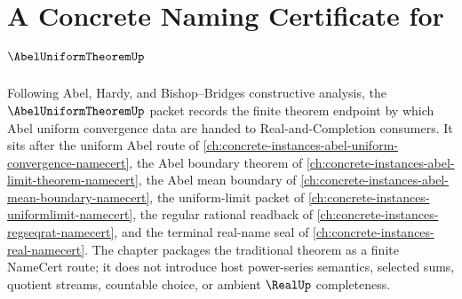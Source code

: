 \chapter{A Concrete Naming Certificate for $\AbelUniformTheoremUp$}
\label{ch:concrete-instances-abel-uniform-theorem-namecert}

Following Abel, Hardy, and Bishop--Bridges constructive analysis, the $\AbelUniformTheoremUp$ packet records the finite theorem endpoint by which Abel uniform convergence data are handed to Real-and-Completion consumers. It sits after the uniform Abel route of \autoref{ch:concrete-instances-abel-uniform-convergence-namecert}, the Abel boundary theorem of \autoref{ch:concrete-instances-abel-limit-theorem-namecert}, the Abel mean boundary of \autoref{ch:concrete-instances-abel-mean-boundary-namecert}, the uniform-limit packet of \autoref{ch:concrete-instances-uniformlimit-namecert}, the regular rational readback of \autoref{ch:concrete-instances-regseqrat-namecert}, and the terminal real-name seal of \autoref{ch:concrete-instances-real-namecert}. The chapter packages the traditional theorem as a finite NameCert route; it does not introduce host power-series semantics, selected sums, quotient streams, countable choice, or ambient $\RealUp$ completeness.

